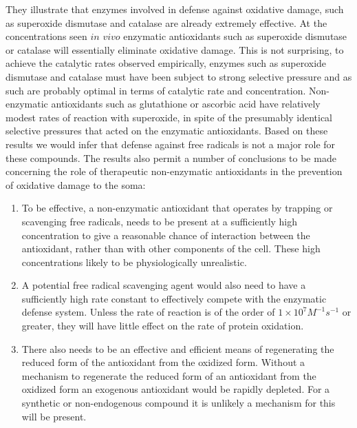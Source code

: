 \documentclass[preprint,12pt,authoryear]{elsarticle}
\begin{document}
They illustrate that enzymes involved in defense against oxidative damage,
such as superoxide dismutase and catalase  are already extremely effective. At the
concentrations seen $in$ $vivo$ enzymatic antioxidants such as superoxide dismutase or catalase will essentially eliminate oxidative damage. This is not
surprising, to achieve the catalytic rates observed empirically, enzymes such as superoxide dismutase and catalase must have been subject to
strong selective pressure and as such are probably optimal in terms of catalytic rate and concentration. Non-enzymatic antioxidants such as glutathione or ascorbic acid have relatively modest rates of reaction with superoxide, in spite of the presumably identical
selective pressures that acted on the enzymatic antioxidants. Based on these results we would infer that defense against free radicals is
not a major role for these compounds.
The results also permit a number of conclusions to be made concerning the role of
therapeutic non-enzymatic antioxidants in the prevention of
oxidative damage to the soma:
\begin{enumerate}
\item
To be effective, a non-enzymatic antioxidant that operates by
trapping or scavenging free radicals, needs to be present at 
a sufficiently high concentration to give a reasonable chance 
of interaction between the antioxidant,
rather than with other components of the cell.
These high concentrations likely to be physiologically unrealistic.
\item
A potential free radical scavenging agent would also need to have a 
sufficiently high rate constant to effectively compete with the 
enzymatic defense system. Unless the rate of reaction is of the order of
$1 \times 10^7 M^{-1} s^{-1}$ or greater, they will have little 
effect on the rate of protein oxidation.
\item
There also needs to be an effective and efficient means of regenerating the
reduced form of the antioxidant from the oxidized form. Without a mechanism to
regenerate the reduced form of an antioxidant from the oxidized form an
exogenous antioxidant would be rapidly depleted. For a synthetic or 
non-endogenous compound it is unlikely a mechanism for this will be present.
\end{enumerate}
\end{document}
